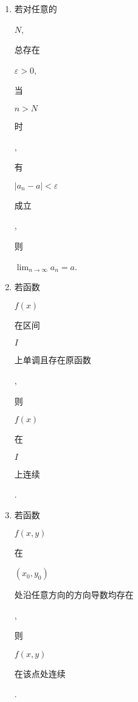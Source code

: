 \documentclass[10pt]{article}
\begin{document}
\begin{enumerate}
  \item \begin{CJK}{UTF8}{mj}若对任意的\end{CJK} $N$, \begin{CJK}{UTF8}{mj}总存在\end{CJK} $\varepsilon>0$, \begin{CJK}{UTF8}{mj}当\end{CJK} $n>N$ \begin{CJK}{UTF8}{mj}时\end{CJK}, \begin{CJK}{UTF8}{mj}有\end{CJK} $\left|a_{n}-a\right|<\varepsilon$ \begin{CJK}{UTF8}{mj}成立\end{CJK}, \begin{CJK}{UTF8}{mj}则\end{CJK} $\lim _{n \rightarrow \infty} a_{n}=a$.

  \item \begin{CJK}{UTF8}{mj}若函数\end{CJK} $f(x)$ \begin{CJK}{UTF8}{mj}在区间\end{CJK} $I$ \begin{CJK}{UTF8}{mj}上单调且存在原函数\end{CJK}, \begin{CJK}{UTF8}{mj}则\end{CJK} $f(x)$ \begin{CJK}{UTF8}{mj}在\end{CJK} $I$ \begin{CJK}{UTF8}{mj}上连续\end{CJK}.

  \item \begin{CJK}{UTF8}{mj}若函数\end{CJK} $f(x, y)$ \begin{CJK}{UTF8}{mj}在\end{CJK} $\left(x_{0}, y_{0}\right)$ \begin{CJK}{UTF8}{mj}处沿任意方向的方向导数均存在\end{CJK}, \begin{CJK}{UTF8}{mj}则\end{CJK} $f(x, y)$ \begin{CJK}{UTF8}{mj}在该点处连续\end{CJK}.


\end{enumerate}
\end{document}
